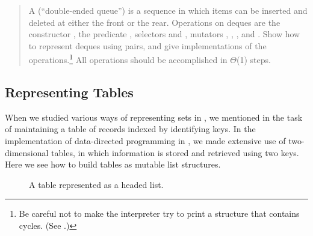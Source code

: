 \begin{quote}
 A  (``double-ended
queue'') is a sequence in which items can be inserted and deleted at either the
front or the rear.  Operations on deques are the constructor ,
the predicate , selectors  and
, mutators ,
, , and
.  Show how to represent deques using pairs, and give
implementations of the operations.\footnote{Be careful not to make the
interpreter try to print a structure that contains cycles.  (See .)}
All operations should be accomplished in \( \Theta \)(1) steps.
\end{quote}

\subsection{Representing Tables}
\label{Section 3.3.3}

When we studied various ways of representing sets in , we
mentioned in  the task of maintaining a table of records
indexed by identifying keys.  In the implementation of data-directed
programming in , we made extensive use of two-dimensional
tables, in which information is stored and retrieved using two keys.  Here we
see how to build tables as mutable list structures.

\begin{figure}[tb]
\label{Figure 3.22}
\centering
\begin{comment}
\heading{Figure 3.22:} A table represented as a headed list.

\begin{example}
 +---+---+    +---+---+    +---+---+    +---+---+
 | * | *-+--->| * | *-+--->| * | *-+--->| * | / |
 +-|-+---+    +-|-+---+    +-|-+---+    +-|-+---+
   |            |            |            |
   V            V            V            V
+---------+   +---+---+   +---+---+   +---+---+
| *table* |   | * | * |   | * | * |   | * | * |
+---------+   +-|-+-|-+   +-|-+-|-+   +-|-+-|-+
                |   |       |   |       |   |
                V   V       V   V       V   V
             +---+ +---+ +---+ +---+ +---+ +---+
             | a | | 1 | | b | | 2 | | c | | 3 |
             +---+ +---+ +---+ +---+ +---+ +---+
\end{example}
\end{comment}

\par\bigskip
\noindent
{} A table represented as a headed list.
\end{figure}

